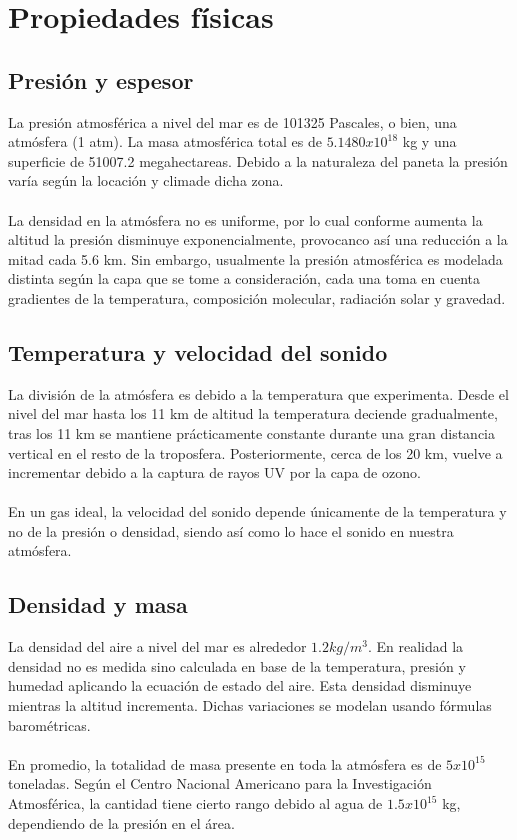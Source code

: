 \documentclass{article}
\begin{document}
\section{Propiedades físicas}

    \subsection{Presión y espesor}
    
    La presión atmosférica a nivel del mar es de 101325 Pascales, o bien, una atmósfera (1 atm). La masa atmosférica total es de $5.1480x10^{18}$ kg y una superficie de 51007.2 megahectareas. Debido a la naturaleza del paneta la presión  varía según la locación y climade dicha zona.
    \\
    \\ La densidad en la atmósfera no es uniforme, por lo cual conforme aumenta la altitud la presión disminuye exponencialmente, provocanco así una reducción a la mitad cada 5.6 km. Sin embargo, usualmente la presión atmosférica es modelada distinta según la capa que se tome a consideración, cada una toma en cuenta gradientes de la temperatura, composición molecular, radiación solar y gravedad.
    
    \subsection{Temperatura y velocidad del sonido}
    
    La división de la atmósfera es debido a la temperatura que experimenta. Desde el nivel del mar hasta los 11 km de altitud la temperatura deciende gradualmente, tras los 11 km se mantiene prácticamente constante durante una gran distancia vertical en el resto de la troposfera. Posteriormente, cerca de los 20 km, vuelve a incrementar debido a la captura de rayos UV por la capa de ozono.
    \\
    \\ En un gas ideal, la velocidad del sonido depende únicamente de la temperatura y no de la presión o densidad, siendo así como lo hace el sonido en nuestra atmósfera.
    
    \subsection{Densidad y masa}
    
    La densidad del aire a nivel del mar es alrededor $1.2 kg/m^{3}$. En realidad la densidad no es medida sino calculada en base de la temperatura, presión y humedad aplicando la ecuación de estado del aire. Esta densidad disminuye mientras la altitud incrementa. Dichas variaciones se modelan usando fórmulas barométricas.
    \\
    \\ En promedio, la totalidad de masa presente en toda la atmósfera es de $5x10^{15}$ toneladas. Según el Centro Nacional Americano para la Investigación Atmosférica, la cantidad tiene cierto rango debido al agua de $1.5x10^{15}$ kg, dependiendo de la presión en el área.
    
\end{document}
